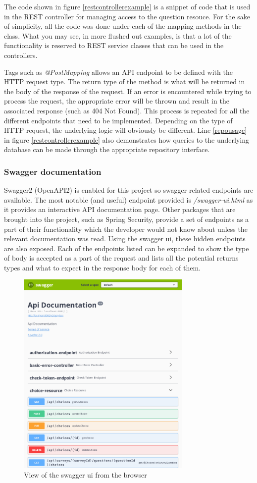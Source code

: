 The code shown in figure \ref{restcontrollerexample} is a snippet of code that is used in the REST controller for managing access to the question resouce.
For the sake of simplicity, all the code was done under each of the mapping methods in the class.
What you may see, in more flushed out examples, is that a lot of the functionality is reserved to REST service classes that can be used in the controllers.

Tags such as \textit{@PostMapping} allows an API endpoint to be defined with the HTTP request type.
The return type of the method is what will be returned in the body of the response of the request.
If an error is encountered while trying to process the request, the appropriate error will be thrown and result in the associated response (such as 404 Not Found).
This process is repeated for all the different endpoints that need to be implemented.
Depending on the type of HTTP request, the underlying logic will obviously be different. 
Line \ref{repousage} in figure \ref{restcontrollerexample} also demonstrates how queries to the underlying database can be made through the appropriate
repository interface.

\subsubsection{Swagger documentation}
Swagger2 (OpenAPI2) is enabled for this project so swagger related endpoints are available.
The most notable (and useful) endpoint provided is \textit{/swagger-ui.html} as it provides an interactive API documentation page.
Other packages that are brought into the project, such as Spring Security, provide a set of endpoints as a part of their functionality which
the developer would not know about unless the relevant documentation was read. 
Using the swagger ui, these hidden endpoints are also exposed.
Each of the endpoints listed can be expanded to show the type of body is accepted as a part of the request and lists all the potential 
returns types and what to expect in the response body for each of them.

\begin{figure}[ht]
    \centering
    \includegraphics[width=320px]{images/swagger-ui.png}
    \caption{View of the swagger ui from the browser}
    \label{swaggerui}
\end{figure}

